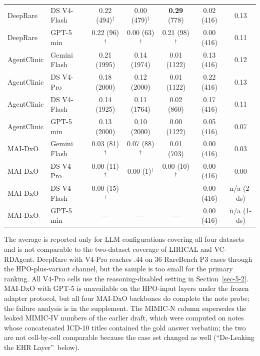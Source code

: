 \documentclass[letterpaper]{article} %
\begin{document}
\begin{table}[t]
\begin{tabular}{@{}llccccc@{}}
DeepRare  &  DS V4-Flash  &  \cellcolor{heatB}0.22 (494)$^{\dagger}$ & \cellcolor{heatE}0.00 (479)$^{\dagger}$ & \cellcolor{heatB}\textbf{0.29} (778) & \cellcolor{heatE}0.02 (416) & \cellcolor{heatA}0.13  \\
DeepRare  &  GPT-5 min  &  \cellcolor{heatB}0.22 (96)$^{\dagger}$ & \cellcolor{heatE}0.00 (63)$^{\dagger}$ & \cellcolor{heatB}0.21 (98)$^{\dagger}$ & \cellcolor{heatE}0.00 (416) & \cellcolor{heatA}0.11  \\
AgentClinic  &  Gemini Flash  &  \cellcolor{heatB}0.21 (1995) & \cellcolor{heatA}0.14 (1974) & \cellcolor{heatE}0.01 (1122) & \cellcolor{heatA}0.13 (416) & \cellcolor{heatA}0.12  \\
AgentClinic  &  DS V4-Pro  &  \cellcolor{heatA}0.18 (2000) & \cellcolor{heatA}0.12 (2000) & \cellcolor{heatE}0.01 (1122) & \cellcolor{heatB}0.22 (416) & \cellcolor{heatA}0.13  \\
AgentClinic  &  DS V4-Flash  &  \cellcolor{heatA}0.14 (1925) & \cellcolor{heatA}0.11 (1764) & \cellcolor{heatE}0.02 (860) & \cellcolor{heatA}0.17 (416) & \cellcolor{heatA}0.11  \\
AgentClinic  &  GPT-5 min  &  \cellcolor{heatA}0.13 (2000) & \cellcolor{heatA}0.10 (2000) & \cellcolor{heatE}0.00 (1122) & \cellcolor{heatE}0.05 (416) & \cellcolor{heatE}0.07  \\
MAI-DxO  &  Gemini Flash  &  \cellcolor{heatE}0.03 (81)$^{\dagger}$ & \cellcolor{heatE}0.07 (88)$^{\dagger}$ & \cellcolor{heatE}0.01 (703) & \cellcolor{heatE}0.00 (416) & \cellcolor{heatE}0.03  \\
MAI-DxO  &  DS V4-Pro  &  \cellcolor{heatE}0.00 (11)$^{\dagger}$ & \cellcolor{heatE}0.00 (1)$^{\dagger}$ & \cellcolor{heatE}0.00 (10)$^{\dagger}$ & \cellcolor{heatE}0.00 (416) & \cellcolor{heatE}0.00  \\
MAI-DxO  &  DS V4-Flash  &  \cellcolor{heatE}0.00 (15)$^{\dagger}$ & --- & --- & \cellcolor{heatE}0.00 (416) & n/a (2-ds)  \\
MAI-DxO  &  GPT-5 min  &  --- & --- & --- & \cellcolor{heatE}0.00 (416) & n/a (1-ds)  \\
\bottomrule
\end{tabular}
\end{table}

The average is reported only for LLM configurations covering all four datasets and is not comparable to the two-dataset coverage of LIRICAL and VC-RDAgent. DeepRare with V4-Pro reaches .44 on 36 RareBench P3 cases through the HPO-plus-variant channel, but the sample is too small for the primary ranking. All V4-Pro cells use the reasoning-disabled setting in Section~\ref{sec-5-2}. MAI-DxO with GPT-5 is unavailable on the HPO-input layers under the frozen adapter protocol, but all four MAI-DxO backbones do complete the note probe; the failure analysis is in the supplement. The MIMIC-N column supersedes the leaked MIMIC-IV numbers of the earlier draft, which were computed on notes whose concatenated ICD-10 titles contained the gold answer verbatim; the two are not cell-by-cell comparable because the case set changed as well (``De-Leaking the EHR Layer''\ below).
\end{document}
